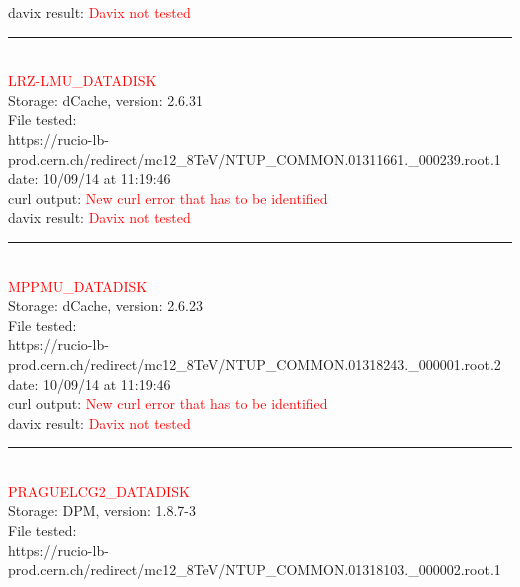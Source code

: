 davix result:  \textcolor{red}{Davix not tested}\\

\rule{\textwidth}{1pt}\\

\textcolor{red}{\normalsize{LRZ-LMU\_DATADISK}}\\

Storage: dCache, version: 2.6.31\\

File tested:\\
\footnotesize{https://rucio-lb-prod.cern.ch/redirect/mc12\_8TeV/NTUP\_COMMON.01311661.\_000239.root.1}\\

date: 10/09/14 at 11:19:46\\

curl output:  \textcolor{red}{New curl error that has to be identified}\\

davix result:  \textcolor{red}{Davix not tested}\\

\rule{\textwidth}{1pt}\\

\textcolor{red}{\normalsize{MPPMU\_DATADISK}}\\

Storage: dCache, version: 2.6.23\\

File tested:\\
\footnotesize{https://rucio-lb-prod.cern.ch/redirect/mc12\_8TeV/NTUP\_COMMON.01318243.\_000001.root.2}\\

date: 10/09/14 at 11:19:46\\

curl output:  \textcolor{red}{New curl error that has to be identified}\\

davix result:  \textcolor{red}{Davix not tested}\\

\rule{\textwidth}{1pt}\\

\textcolor{red}{\normalsize{PRAGUELCG2\_DATADISK}}\\

Storage: DPM, version: 1.8.7-3\\

File tested:\\
\footnotesize{https://rucio-lb-prod.cern.ch/redirect/mc12\_8TeV/NTUP\_COMMON.01318103.\_000002.root.1}\\

